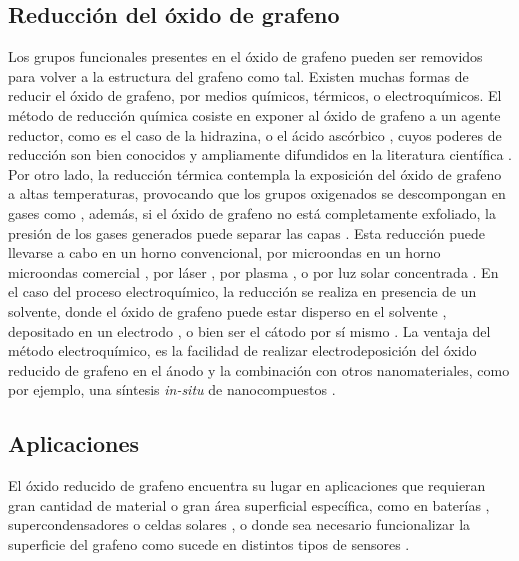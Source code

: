 \subsection*{Reducción del óxido de grafeno}
Los grupos funcionales presentes en el óxido de grafeno pueden ser removidos para volver a la estructura del grafeno como tal.
Existen muchas formas de reducir el óxido de grafeno, por medios químicos, térmicos, o electroquímicos. El método de reducción química cosiste en exponer al óxido de grafeno a un agente reductor, como es el caso de la hidrazina, o el ácido ascórbico \citep{Fernandez-Merino2010}, cuyos poderes de reducción son bien conocidos y ampliamente difundidos en la literatura científica \citep{Chua2015}. Por otro lado, la reducción térmica contempla la exposición del óxido de grafeno a altas temperaturas, provocando que los grupos oxigenados se descompongan en gases como , además, si el óxido de grafeno no está completamente exfoliado, la presión de los gases generados puede separar las capas \citep{Pei2012}. Esta reducción puede llevarse a cabo en un horno convencional, por microondas en un horno microondas comercial \citep{Zhu2010a}, por láser \citep{El-Kady2013}, por plasma \citep{Lee2012}, o por luz solar concentrada \citep{Mohandoss2017}. En el caso del proceso electroquímico, la reducción se realiza en presencia de un solvente, donde el óxido de grafeno puede estar disperso en el solvente \citep{Liu2011}, depositado en un electrodo \citep{Harima2011, Toh2014}, o bien ser el cátodo por sí mismo \citep{Feng2016}. La ventaja del método electroquímico, es la facilidad de realizar electrodeposición del óxido reducido de grafeno en el ánodo y la combinación con otros nanomateriales, como por ejemplo, una síntesis \emph{in-situ} de nanocompuestos \citep{Liu2011, Xie2014}.


\subsection*{Aplicaciones}
El óxido reducido de grafeno encuentra su lugar en aplicaciones que requieran gran cantidad de material o gran área superficial específica, como en baterías \citep{Li2014}, supercondensadores \citep{Stoller2008} o celdas solares \citep{Roy-mayhew2014}, o donde sea necesario funcionalizar la superficie del grafeno como sucede en distintos tipos de sensores \citep{Schedin2007, Haick2013}.

